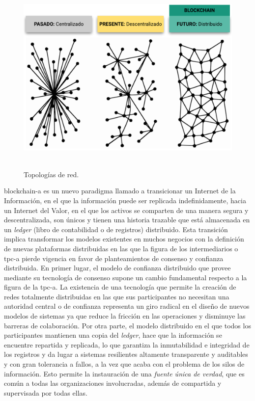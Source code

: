 \documentclass[12pt,a4paper, twoside]{report}
\begin{document}
	\begin{figure}[!ht]   
		\caption{Topologías de red.} 
		\begin{center} 
			\includegraphics[width=15cm,height=9cm]{Images/stateArt/intro} \\
			\label{fig:stateArt_intro} 
		\end{center}  
	\end{figure}
	
	\gls{blockchain-a} es un nuevo paradigma llamado a transicionar un Internet de la Información, en el que la información puede ser replicada indefinidamente, hacia un Internet del Valor, en el que los activos se comparten de una manera segura y descentralizada, son únicos y tienen una historia trazable que está almacenada en un \textit{ledger} (libro de contabilidad o de registros) distribuido. Esta transición implica transformar los modelos existentes en muchos negocios con la definición de nuevas plataformas distribuidas en las que la figura de los intermediarios o \gls{tpc-a} pierde vigencia en favor de planteamientos de consenso y confianza distribuida. En primer lugar, el modelo de confianza distribuido que provee mediante su tecnología de consenso supone un cambio fundamental respecto a la figura de la \gls{tpc-a}. La existencia de una tecnología que permite la creación de redes totalmente distribuidas en las que sus participantes no necesitan una autoridad central o de confianza representa un giro radical en el diseño de nuevos modelos de sistemas ya que reduce la fricción en las operaciones y disminuye las barreras de colaboración. Por otra parte, el modelo distribuido en el que todos los participantes mantienen una copia del \textit{ledger}, hace que la información se encuentre repartida y replicada, lo que garantiza la inmutabilidad e integridad de los registros y da lugar a sistemas resilientes altamente transparente y auditables y con gran tolerancia a fallos, a la vez que acaba con el problema de los silos de información. Esto permite la instauración de una \textit{fuente única de verdad}, que es común a todas las organizaciones involucradas, además de compartida y supervisada por todas ellas. \\
		
\end{document}
